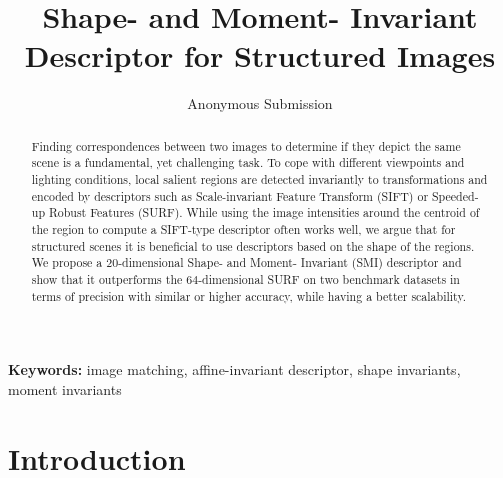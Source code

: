 \documentclass[a4paper,11pt]{article}
\begin{document}
\title{Shape- and Moment- Invariant Descriptor for Structured Images}

\author{Anonymous Submission}

\date{}
\maketitle
\thispagestyle{empty}



\begin{abstract}
Finding correspondences between two images to determine if they depict the same scene is a fundamental, yet challenging task. To cope with different viewpoints and lighting conditions, local salient regions are detected invariantly to transformations and encoded by descriptors such as Scale-invariant Feature Transform (SIFT) or Speeded-up Robust Features (SURF). While using the image intensities around the centroid of the region to compute a SIFT-type descriptor often works well, we argue that for structured scenes it is beneficial to use descriptors based on the shape of the regions. We propose a $20$-dimensional Shape- and Moment- Invariant (SMI) descriptor and show that it outperforms the $64$-dimensional SURF on two benchmark datasets in terms of precision with similar or higher accuracy, while having a better scalability.
\end{abstract}
\textbf{Keywords:} image matching, affine-invariant descriptor, shape invariants, moment invariants



\section{Introduction}
\end{document}
